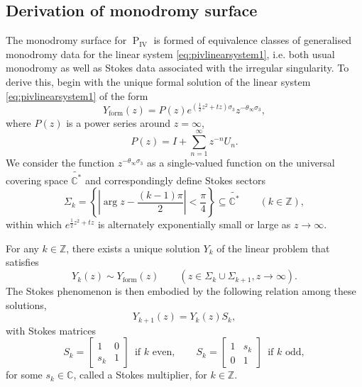 \documentclass[a4paper,reqno]{amsart}
\numberwithin{equation}{section}
\newcommand{\pain}[1]{\operatorname{P}_{\mathrm{#1}}}
\numberwithin{equation}{section}
\begin{document}
\subsection{Derivation of monodromy surface}

The monodromy surface for $\pain{IV}$ is formed of equivalence classes of generalised monodromy data for the linear system \eqref{eq:pivlinearsystem1}, i.e. both usual monodromy as well as Stokes data associated with the irregular singularity.
To derive this, begin with the unique formal solution of the linear system \eqref{eq:pivlinearsystem1} of the form
\begin{equation}\label{eq:formalsolPIV}
    Y_{\operatorname{form}}(z)=P(z) e^{(\frac{1}{2}z^2+t z)\sigma_3}z^{-\theta_\infty \sigma_3},
\end{equation}
where $P(z)$ is a power series around $z=\infty$,
\begin{equation} \label{eq:matrixPasymptoticPIV}
    P(z)=I+\sum_{n=1}^\infty z^{-n}U_n.
\end{equation}
We consider the function $z^{-\theta_\infty \sigma_3}$ as a single-valued function on the universal covering space $\widetilde{\mathbb{C}^*}$ and correspondingly define Stokes sectors
\begin{equation*}
    \Sigma_k=\left\{\left|\arg z- \frac{(k-1)\pi}{2}\right|<\frac{\pi}{4}\right\}\subseteq \widetilde{\mathbb{C}^*} \qquad (k\in\mathbb{Z}),
\end{equation*}
within which $e^{\frac{1}{2}z^2+t z}$ is alternately exponentially small or large as $z\rightarrow \infty$.

For any $k\in\mathbb{Z}$, there exists a unique solution $Y_k$ of the linear problem that satisfies
\begin{equation*}
    Y_k(z)\sim Y_{\operatorname{form}}(z)\qquad (z\in \Sigma_k\cup \Sigma_{k+1}, z\rightarrow \infty).
\end{equation*}
The Stokes phenomenon is then embodied by the following relation among these solutions,
\begin{equation}\label{eq:pivstokes}
    Y_{k+1}(z)=Y_k(z)S_k,
\end{equation}
with Stokes matrices
\begin{equation*}
    S_k=\begin{bmatrix}
        1 & 0\\
        s_k & 1
    \end{bmatrix}\,\,\, \text{if $k$ even},\qquad
    S_k=\begin{bmatrix}
        1 & s_k\\
        0 & 1
    \end{bmatrix}\,\,\, \text{if $k$ odd},
\end{equation*}
for some $s_k\in\mathbb{C}$, called a Stokes multiplier, for $k\in\mathbb{Z}$.
\end{document}
